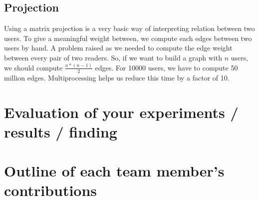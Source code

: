 \documentclass[11pt]{article}
\begin{document}
\subsection{Projection}

Using a matrix projection is a very basic way of interpreting relation between two users. To give a meaningful weight between, we compute each edges between two users by hand. A problem raised as we needed to compute the edge weight between every pair of two readers. So, if we want to build a graph with $n$ users, we should compute $\frac{n * (n-1)}{2}$ edges. For 10000 users, we have to compute 50 million edges. Multiprocessing helps us reduce this time by a factor of 10.

\section{Evaluation of your experiments / results / finding}






\section{Outline of each team member’s contributions}






\end{document}

